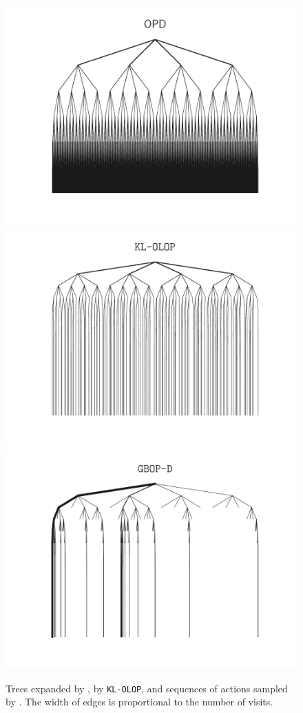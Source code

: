 \documentclass[runningheads]{llncs}
\begin{document}
\begin{figure}[tp]
	\centering
	\includegraphics[trim={0 0.5cm 0 0.5cm}, clip, width=0.85\linewidth]{img/tree_OPD.pdf}
    \includegraphics[trim={0 0.5cm 0 0.5cm}, clip, width=0.85\linewidth]{img/tree_KL-OLOP.pdf}
	\includegraphics[trim={0 0.5cm 0 0.5cm}, clip, width=0.85\linewidth]{img/tree_GBOP-D.pdf}
	\caption{Trees expanded by \OPD, by \texttt{KL-OLOP}, and sequences of actions sampled by \GBOPD. The width of edges is proportional to the number of visits.}
	\label{fig:suppl-trees}
\end{figure}

\end{document}
